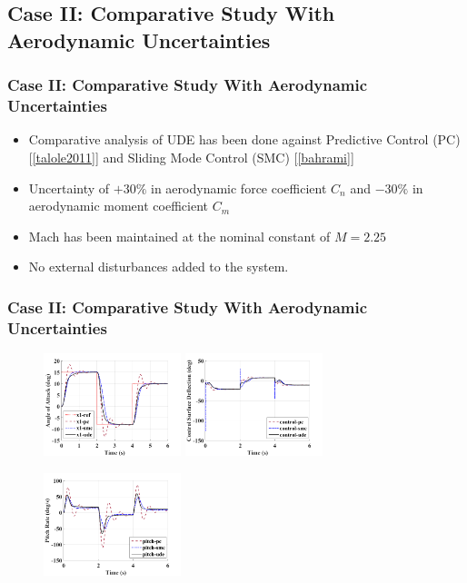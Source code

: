 \documentclass[table,10pt,red]{beamer}	%
\begin{document}
\subsection{Case II: Comparative Study With Aerodynamic Uncertainties}
\begin{frame}
\frametitle{Case II: Comparative Study With Aerodynamic Uncertainties}
\begin{itemize}  %
		\item Comparative analysis of UDE has been done against Predictive Control (PC) [\ref{talole2011}] and Sliding Mode Control (SMC) [\ref{bahrami}]
		\bigskip
		\item Uncertainty of $+30\%$ in aerodynamic force coefficient $C_n$ and $-30\%$ in aerodynamic moment coefficient $C_m$
		\bigskip
		\item Mach has been maintained at the nominal constant of $M = 2.25$ 
		\bigskip
		\item No external disturbances added to the system.
\end{itemize}
\end{frame}
%
\begin{frame} 
\frametitle{Case II: Comparative Study With Aerodynamic Uncertainties}
\begin{figure}
\includegraphics[width=4cm]{x1_kcn_13_kcm_07}
\includegraphics[width=4cm]{control_kcn_13_kcm_07}
\begin{center}
\includegraphics[width=4cm]{pitch_kcn_13_kcm_07}
\end{center}
\end{figure}
\end{frame}
\end{document}
